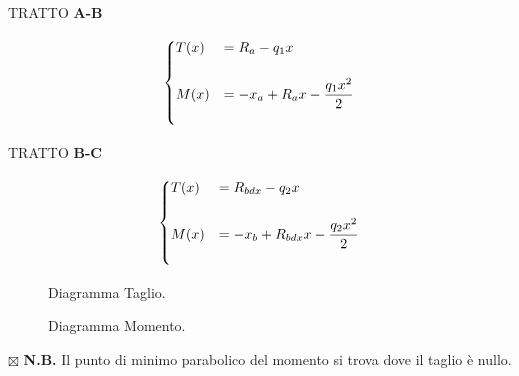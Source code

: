 \documentclass[a4paper,12pt, oneside]{book}
\begin{document}
	TRATTO \textbf{A-B}
	
	\begin{equation}
		\centering
		\begin{cases}
			T(x)&=R_a - q_1 x \\ \\
			M(x)&=-x_a+R_a x-\dfrac{q_1 x^2}{2}\\ \\ 
		\end{cases}
		\hfill
	\end{equation}
	
	TRATTO \textbf{B-C}
	
	\begin{equation}
		\centering
		\begin{cases}
			T(x)&=R_{bdx} - q_2 x \\ \\
			M(x)&=-x_b+R_{bdx} x-\dfrac{q_2 x^2}{2}\\ \\ 
		\end{cases}
		\hfill
	\end{equation}
	
	\begin{figure}[H]
		\centering
		\caption{Diagramma Taglio.}
		\label{fig:sdv xccxcv}
	\end{figure}
	
	\begin{figure}[H]
		\centering
		\caption{Diagramma Momento.}
		\label{fig:hvjghv}
	\end{figure}
	
	$\boxtimes$ \textbf{N.B.} Il punto di minimo parabolico del momento si trova dove il taglio è nullo.
	
	\break
	
\end{document}
